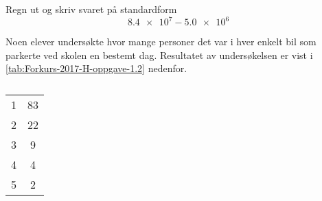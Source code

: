 %


\Oppgave[1] 

Regn ut og skriv svaret på standardform
%
\begin{equation*}
  \num{8.4e7} - \num{5.0e6}
\end{equation*}


\Oppgave[5]

Noen elever undersøkte hvor mange personer det var i hver enkelt bil som
parkerte ved skolen en bestemt dag. Resultatet av undersøkelsen er vist i
\cref{tab:Forkurs-2017-H-oppgave-1.2} nedenfor.

\begin{table}[H]
    \centering
    \caption{}
    \label{tab:Forkurs-1p-2p-laererutdanning-2017-V-U-oppgave-1-2}
    \begin{tabular}{|S[table-format=1.0]|S[table-format=2.0]|}
         1 &  83 \\
         2 &  22 \\
         3 &   9 \\
         4 &   4 \\
         5 &   2 \\ \hline
    \end{tabular}
\end{table}

